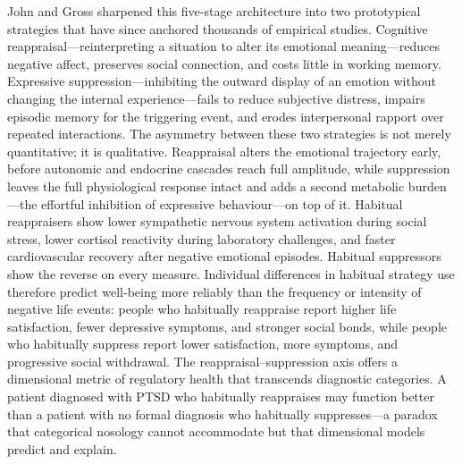 John and Gross sharpened this five-stage architecture into two prototypical
strategies that have since anchored thousands of empirical
studies.\cite{john2004}  Cognitive reappraisal---reinterpreting a situation to alter
its emotional meaning---reduces negative affect, preserves social
connection, and costs little in working memory.  Expressive
suppression---inhibiting the outward display of an emotion without changing
the internal experience---fails to reduce subjective distress, impairs
episodic memory for the triggering event, and erodes interpersonal rapport
over repeated interactions.  The asymmetry between these two strategies is
not merely quantitative; it is qualitative.  Reappraisal alters the
emotional trajectory early, before autonomic and endocrine cascades reach
full amplitude, while suppression leaves the full physiological response
intact and adds a second metabolic burden---the effortful inhibition of
expressive behaviour---on top of it.  Habitual reappraisers show lower
sympathetic nervous system activation during social stress, lower cortisol
reactivity during laboratory challenges, and faster cardiovascular recovery
after negative emotional episodes.  Habitual suppressors show the reverse
on every measure.\cite{john2004}  Individual differences in habitual strategy use
therefore predict well-being more reliably than the frequency or intensity
of negative life events: people who habitually reappraise report higher
life satisfaction, fewer depressive symptoms, and stronger social bonds,
while people who habitually suppress report lower satisfaction, more
symptoms, and progressive social withdrawal.  The reappraisal--suppression
axis offers a dimensional metric of regulatory health that transcends
diagnostic categories.  A patient diagnosed with PTSD who habitually
reappraises may function better than a patient with no formal diagnosis who
habitually suppresses---a paradox that categorical nosology cannot
accommodate but that dimensional models predict and explain.

